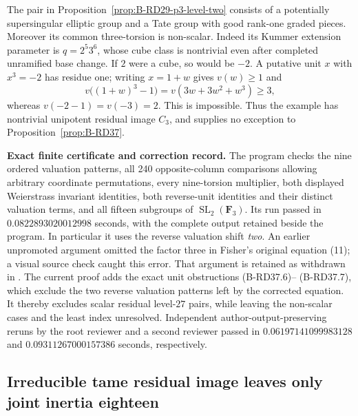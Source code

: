 \begin{remark}
\label{rem:B-RD37-known-example}
The pair in Proposition~\ref{prop:B-RD29-p3-level-two} consists of
a potentially supersingular elliptic group and a Tate group with
good rank-one graded pieces. Moreover its common three-torsion is
non-scalar. Indeed its Kummer extension parameter is
$q=2^5 3^6$, whose cube class is nontrivial even after completed
unramified base change. If $2$ were a cube, so would be $-2$.
A putative unit $x$ with $x^3=-2$ has residue one; writing
$x=1+w$ gives $v(w)\ge1$ and
\[
 v\bigl((1+w)^3-1\bigr)
   =v(3w+3w^2+w^3)\ge3,
\]
whereas $v(-2-1)=v(-3)=2$. This is impossible.
Thus the example has nontrivial unipotent residual image $C_3$,
and supplies no exception to Proposition~\ref{prop:B-RD37}.
\end{remark}

\par\smallskip\noindent\textbf{Exact finite certificate and correction record.}
The program  checks
the nine ordered valuation patterns, all 240 opposite-column
comparisons allowing arbitrary coordinate permutations, every
nine-torsion multiplier, both displayed Weierstrass invariant
identities, both reverse-unit identities and their distinct valuation
terms, and all fifteen subgroups of
$\operatorname{SL}_2(\mathbf F_3)$. Its run passed in
$0.0822893020012998$ seconds, with the complete output retained
beside the program. In particular it uses the reverse valuation
shift \emph{two}. An earlier unpromoted argument omitted the
factor three in Fisher's original equation (11); a visual source
check caught this error. That argument is retained as withdrawn
in .
The current proof adds the exact unit obstructions (B-RD37.6)--
(B-RD37.7), which exclude the two reverse valuation patterns left
by the corrected equation. It thereby excludes scalar residual
level-$27$ pairs, while leaving the non-scalar cases and the least
index unresolved. Independent author-output-preserving reruns by the root
reviewer and a second reviewer passed in $0.06197141099983128$ and
$0.09311267000157386$ seconds, respectively.


\subsection{Irreducible tame residual image leaves only joint inertia eighteen}

